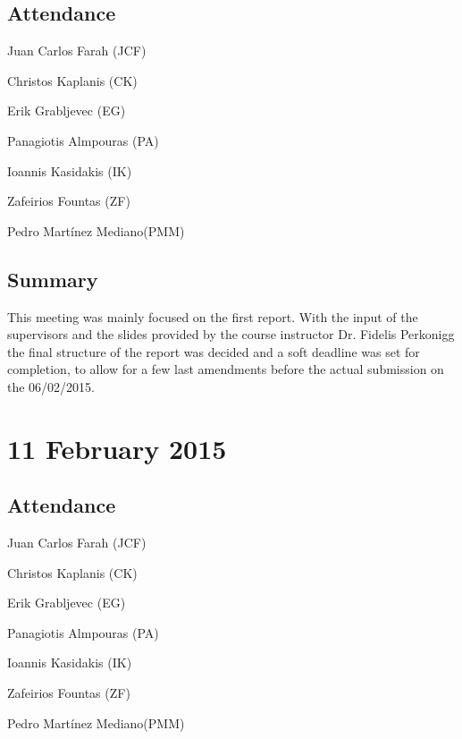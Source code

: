 \documentclass[a4paper,11pt]{article}
\begin{document}
\subsection*{Attendance}
\begin{compactenum}
\item Juan Carlos Farah (JCF)
\item Christos Kaplanis (CK)
\item Erik Grabljevec (EG)
\item Panagiotis Almpouras (PA)
\item Ioannis Kasidakis (IK)
\item Zafeirios Fountas (ZF)
\item Pedro Martínez Mediano(PMM)
\end{compactenum}

\subsection*{Summary}
This meeting was mainly focused on the first report. With the input of the supervisors and the slides provided by the course instructor Dr. Fidelis Perkonigg the final structure of the report was decided and a soft deadline was set for completion, to allow for a few last amendments before the actual submission on the 06/02/2015.

\maketitle
\section*{11 February 2015}
\subsection*{Attendance}
\begin{compactenum}
\item Juan Carlos Farah (JCF)
\item Christos Kaplanis (CK)
\item Erik Grabljevec (EG)
\item Panagiotis Almpouras (PA)
\item Ioannis Kasidakis (IK)
\item Zafeirios Fountas (ZF)
\item Pedro Martínez Mediano(PMM)
\end{compactenum}
\end{document}
